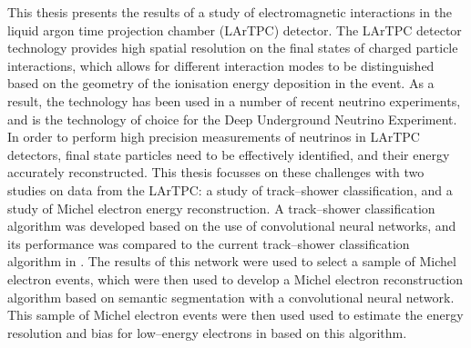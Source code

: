 This thesis presents the results of a study of electromagnetic interactions in 
the \protodune{} liquid argon time projection chamber (LArTPC) detector. The 
LArTPC detector technology provides high spatial resolution on the final states 
of charged particle interactions, which allows for different interaction modes 
to be distinguished based on the geometry of the ionisation energy deposition 
in the event. As a result, the technology has been used in a number of recent 
neutrino experiments, and is the technology of choice for the Deep Underground 
Neutrino Experiment. In order to perform high precision measurements of 
neutrinos in LArTPC detectors, final state particles need to be effectively 
identified, and their energy accurately reconstructed. This thesis focusses on 
these challenges with two studies on data from the \protodune{} LArTPC: a 
study of track--shower classification, and a study of Michel electron energy 
reconstruction. A track--shower classification algorithm was developed based 
on the use of convolutional neural networks, and its performance was compared 
to the current track--shower classification algorithm in \protodune{}. The 
results of this network were used to select a sample of Michel electron 
events, which were then used to develop a Michel electron reconstruction 
algorithm based on semantic segmentation with a convolutional neural network. 
This sample of Michel electron events were then used used to estimate the 
energy resolution and bias for low--energy electrons in \protodune{} based on 
this algorithm.
